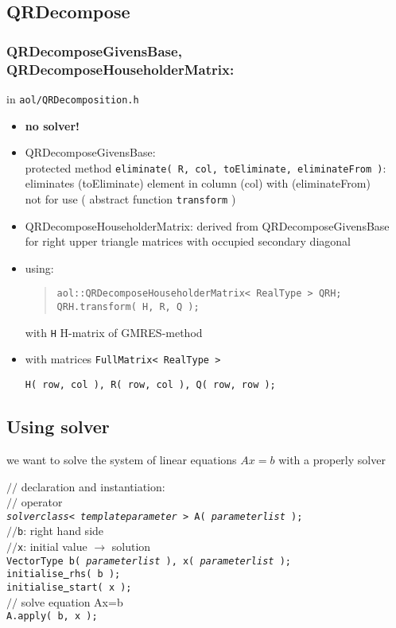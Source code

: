 
\subsection { QRDecompose}
\subsubsection{ QRDecomposeGivensBase, QRDecomposeHouseholderMatrix: } in {\tt aol/QRDecomposition.h}
\begin{itemize}
\item {\bf no solver!}
\item QRDecomposeGivensBase: \\
protected method {\tt eliminate( R, col, toEliminate, eliminateFrom )}:\\
eliminates (toEliminate) element in column (col) with (eliminateFrom) \\
not for use ( abstract function {\tt transform} )
\item QRDecomposeHouseholderMatrix: derived from QRDecomposeGivensBase\\
for right upper triangle matrices with occupied secondary diagonal
\item using: \begin{quote}
{\tt aol::QRDecomposeHouseholderMatrix< RealType > QRH; \\
QRH.transform( H, R, Q );} \end{quote}
with {\tt H} H-matrix of GMRES-method
\item with matrices {\tt FullMatrix< RealType > }
\begin{flushright} {\tt H( row, col ), R( row, col ), Q( row, row ); } \end{flushright}
\end{itemize}



\subsection {Using solver}
we want to solve the system of linear equations $Ax = b$ with a properly solver

$//$ declaration and instantiation:\\
$//$ operator\\
{\tt {\em solverclass}< {\em templateparameter} > A( {\em parameterlist} ); }\\[2ex]
$//${\tt b}: right hand side \\
$//${\tt x}: initial value $\rightarrow$ solution \\
{\tt VectorType b( {\em parameterlist} ), x( {\em parameterlist} ); \\
initialise\underline{ }rhs( b ); \\ initialise\underline{ }start( x );}\\[2ex]
$//$ solve equation Ax=b\\
{\tt A.apply( b, x );}

